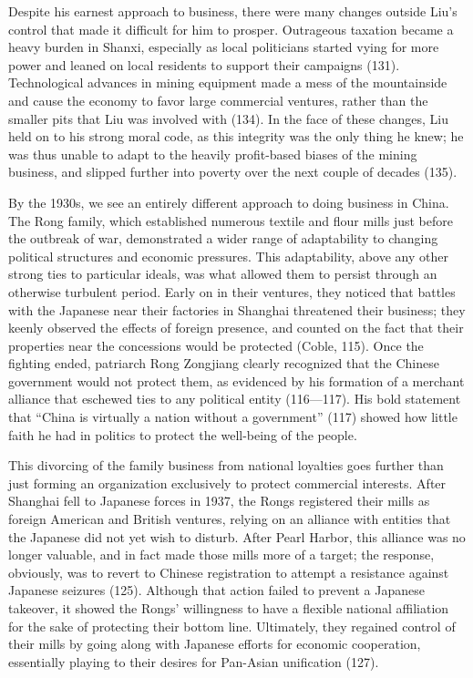 Despite his earnest approach to business, there were many changes outside Liu's
control that made it difficult for him to prosper. Outrageous taxation became a
heavy burden in Shanxi, especially as local politicians started vying for more
power and leaned on local residents to support their campaigns (131).
Technological advances in mining equipment made a mess of the mountainside and
cause the economy to favor large commercial ventures, rather than the smaller
pits that Liu was involved with (134). In the face of these changes, Liu held on
to his strong moral code, as this integrity was the only thing he knew; he was
thus unable to adapt to the heavily profit-based biases of the mining business,
and slipped further into poverty over the next couple of decades (135).

By the 1930s, we see an entirely different approach to doing business in China.
The Rong family, which established numerous textile and flour mills just before
the outbreak of war, demonstrated a wider range of adaptability to changing
political structures and economic pressures. This adaptability, above any other
strong ties to particular ideals, was what allowed them to persist through an
otherwise turbulent period. Early on in their ventures, they noticed that
battles with the Japanese near their factories in Shanghai threatened their
business; they keenly observed the effects of foreign presence, and counted on
the fact that their properties near the concessions would be protected (Coble,
115). Once the fighting ended, patriarch Rong Zongjiang clearly recognized that
the Chinese government would not protect them, as evidenced by his formation of
a merchant alliance that eschewed ties to any political entity (116—117). His
bold statement that ``China is virtually a nation without a government'' (117)
showed how little faith he had in politics to protect the well-being of the
people.

This divorcing of the family business from national loyalties goes further than
just forming an organization exclusively to protect commercial interests. After
Shanghai fell to Japanese forces in 1937, the Rongs registered their mills as
foreign American and British ventures, relying on an alliance with entities that
the Japanese did not yet wish to disturb. After Pearl Harbor, this alliance was
no longer valuable, and in fact made those mills more of a target; the response,
obviously, was to revert to Chinese registration to attempt a resistance against
Japanese seizures (125).  Although that action failed to prevent a Japanese
takeover, it showed the Rongs' willingness to have a flexible national
affiliation for the sake of protecting their bottom line. Ultimately, they
regained control of their mills by going along with Japanese efforts for
economic cooperation, essentially playing to their desires for Pan-Asian
unification (127).

